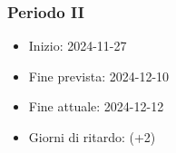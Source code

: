 
\subsubsection{Periodo II}
\begin{itemize}
    \item Inizio: 2024-11-27
    \item Fine prevista: 2024-12-10
    \item Fine attuale: 2024-12-12
    \item Giorni di ritardo: (+2)
\end{itemize}

